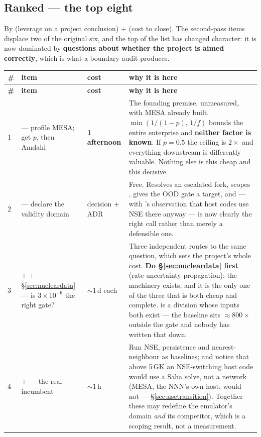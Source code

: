 \subsection{Ranked --- the top eight}
\label{sec:ranked}

By (leverage on a project conclusion) $\div$ (cost to close). The second-pass
items displace two of the original six, and the top of the list has changed
character: it is now dominated by \textbf{questions about whether the project
is aimed correctly}, which is what a boundary audit produces.

\begingroup
\small
\begin{longtable}{@{}L{0.5cm} L{4.0cm} L{1.9cm} L{8.4cm}@{}}
\toprule
\textbf{\#} & \textbf{item} & \textbf{cost} & \textbf{why it is here} \\
\midrule
\endfirsthead
\toprule
\textbf{\#} & \textbf{item} & \textbf{cost} & \textbf{why it is here} \\
\midrule
\endhead
\bottomrule
\endfoot

1 & \warnglyph{}  --- profile MESA; get $p$, then Amdahl &
\textbf{1 afternoon} &
The founding premise, unmeasured, with MESA already built.
$\min(1/(1-p),\,1/f)$ bounds the entire enterprise and \textbf{neither factor
is known}. If $p = 0.5$ the ceiling is $2\times$ and everything downstream is
differently valuable. Nothing else is this cheap and this decisive. \\

2 &  --- declare the validity domain & decision $+$ ADR &
Free. Resolves an escalated fork, scopes , gives the OOD gate a
target, and --- with 's observation that host codes use NSE there
anyway --- is now clearly the right call rather than merely a defensible
one. \\

3 &  $+$  $+$ \S\ref{sec:nucleardata} --- is
$3 \times 10^{-6}$ the right gate? & ${\sim}1$\,d each &
Three independent routes to the same question, which sets the project's whole
cost. \textbf{Do \S\ref{sec:nucleardata} first} (rate-uncertainty
propagation): the machinery exists, and it is the only one of the three that
is both cheap and complete.  is a division whose inputs both exist
--- the baseline sits ${\approx}800\times$ outside the gate and nobody has
written that down. \\

4 &  $+$  --- the real incumbent & ${\sim}1$\,h &
Run NSE, persistence and nearest-neighbour as baselines; and notice that
above 5\,GK an NSE-switching host code would use a Saha solve, not a network
(MESA, the NNN's own host, would not --- \S\ref{sec:nsetransition}). Together
these may redefine the emulator's domain \emph{and} its competitor, which is
a scoping result, not a measurement. \\


\end{longtable}
